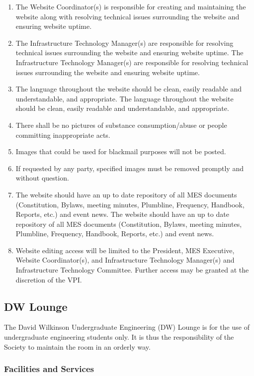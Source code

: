 \begin{enumerate}
 \item
  The Website Coordinator(s) is responsible for creating and maintaining the website along with resolving technical issues surrounding the website and ensuring website uptime.
 \item
  The Infrastructure Technology Manager(s) are responsible for resolving technical issues surrounding the website and ensuring website uptime.
  The Infrastructure Technology Manager(s) are responsible for resolving technical issues surrounding the website and ensuring website uptime.
 \item
  The language throughout the website should be clean, easily readable and understandable, and appropriate.
  The language throughout the website should be clean, easily readable and understandable, and appropriate.
 \item
  There shall be no pictures of substance consumption/abuse or people committing inappropriate acts.
 \item
  Images that could be used for blackmail purposes will not be posted.
 \item
  If requested by any party, specified images must be removed promptly and without question.
 \item
  The website should have an up to date repository of all MES documents (Constitution, Bylaws, meeting minutes, Plumbline, Frequency, Handbook, Reports, etc.) and event news.
  The website should have an up to date repository of all MES documents (Constitution, Bylaws, meeting minutes, Plumbline, Frequency, Handbook, Reports, etc.) and event news.
 \item
  Website editing access will be limited to the President, MES Executive, Website Coordinator(s), and Infrastructure Technology Manager(s) and Infrastructure Technology Committee. Further access may be granted at the discretion of the VPI.

\end{enumerate}

\subsection{DW Lounge}
\label{dw-lounge}
The David Wilkinson Undergraduate Engineering (DW) Lounge is for the use
of undergraduate engineering students only. It is thus the
responsibility of the Society to maintain the room in an orderly way.

\subsubsection{Facilities and Services}
\label{facilities-and-services}

